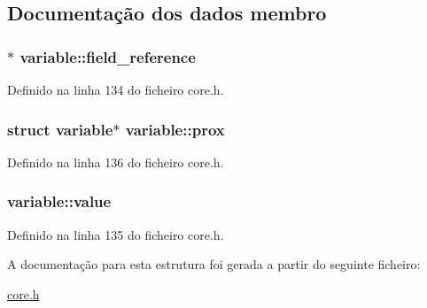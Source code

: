 \subsection{Documentação dos dados membro}
\hypertarget{structvariable_a49911b2c89f7f4e785091675963a3cbd}{
\subsubsection[{field\-\_\-reference}]{$\ast$ variable\-::field\-\_\-reference}}\label{structvariable_a49911b2c89f7f4e785091675963a3cbd}


Definido na linha 134 do ficheiro core.\-h.

\hypertarget{structvariable_aac55069e8378041cc5049f83410d1b5d}{
\subsubsection[{prox}]{\setlength{\rightskip}{0pt plus 5cm}struct {\bf variable}$\ast$ variable\-::prox}}\label{structvariable_aac55069e8378041cc5049f83410d1b5d}


Definido na linha 136 do ficheiro core.\-h.

\hypertarget{structvariable_a163435f346185d4f2d8d05a78dde5bef}{
\subsubsection[{value}]{ variable\-::value}}\label{structvariable_a163435f346185d4f2d8d05a78dde5bef}


Definido na linha 135 do ficheiro core.\-h.



A documentação para esta estrutura foi gerada a partir do seguinte ficheiro\-:\begin{DoxyCompactItemize}
\item 
\hyperlink{core_8h}{core.\-h}\end{DoxyCompactItemize}
